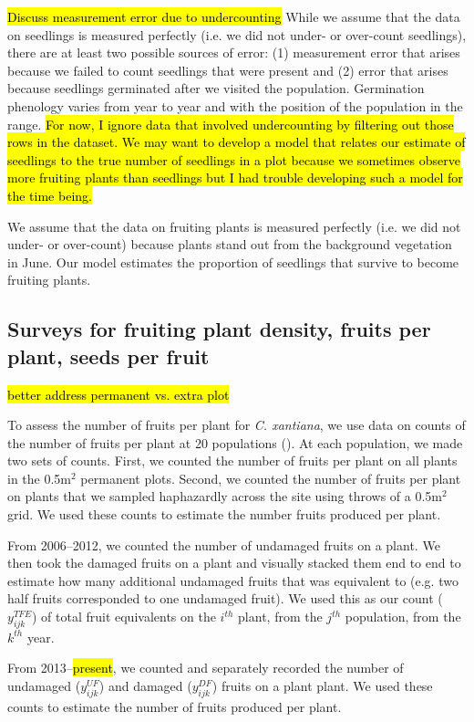 \documentclass[12pt, oneside, titlepage]{article}   	%
\begin{document}
\hl{Discuss measurement error due to undercounting}
While we assume that the data on seedlings is measured perfectly (i.e. we did not under- or over-count seedlings), there are at least two possible sources of error: (1) measurement error that arises because we failed to count seedlings that were present and (2) error that arises because seedlings germinated after we visited the population. Germination phenology varies from year to year and with the position of the population in the range. \hl{For now, I ignore data that involved undercounting by filtering out those rows in the dataset. We may want to develop a model that relates our estimate of seedlings to the true number of seedlings in a plot because we sometimes observe more fruiting plants than seedlings but I had trouble developing such a model for the time being.}

We assume that the data on fruiting plants is measured perfectly (i.e. we did not under- or over-count) because plants stand out from the background vegetation in June. Our model estimates the proportion of seedlings that survive to become fruiting plants.

\subsection{Surveys for fruiting plant density, fruits per plant, seeds per fruit}

\hl{better address permanent vs. extra plot}

To assess the number of fruits per plant for \textit{C. xantiana}, we use data on counts of the number of fruits per plant at 20 populations (\cite{eckhart2011}). At each population, we made two sets of counts. First, we counted the number of fruits per plant on all plants in the 0.5m$^2$ permanent plots. Second, we counted the number of fruits per plant on plants that we sampled haphazardly across the site using throws of a 0.5m$^2$ grid. We used these counts to estimate the number fruits produced per plant. 

From 2006--2012, we counted the number of undamaged fruits on a plant. We then took the damaged fruits on a plant and visually stacked them end to end to estimate how many additional undamaged fruits that was equivalent to (e.g. two half fruits corresponded to one undamaged fruit). We used this as our count ($y^{TFE}_{ijk}$) of total fruit equivalents on the $i^{th}$ plant, from the $j^{th}$ population, from the $k^{th}$ year. 

From 2013--\hl{present}, we counted and separately recorded the number of undamaged ($y^{UF}_{ijk}$) and damaged ($y^{DF}_{ijk}$) fruits on a plant plant. We used these counts to estimate the number of fruits produced per plant.
\end{document}
